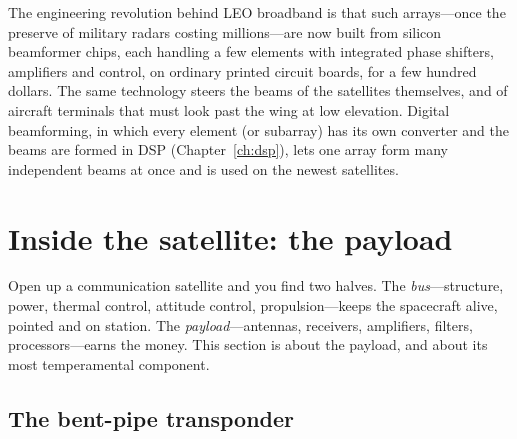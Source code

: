 
The engineering revolution behind LEO broadband is that such arrays---once the preserve of
military radars costing millions---are now built from silicon beamformer chips, each handling
a few elements with integrated phase shifters, amplifiers and control, on ordinary printed
circuit boards, for a few hundred dollars. The same technology steers the beams of the
satellites themselves, and of aircraft terminals that must look past the wing at low
elevation. Digital beamforming, in which every element (or subarray) has its own converter and
the beams are formed in DSP (Chapter~\ref{ch:dsp}), lets one array form many independent beams
at once and is used on the newest satellites.

\section{Inside the satellite: the payload}
\label{sec:ch23:payload}

Open up a communication satellite and you find two halves. The \emph{bus}---structure, power,
thermal control, attitude control, propulsion---keeps the spacecraft alive, pointed and on
station. The \emph{payload}---antennas, receivers, amplifiers, filters, processors---earns the
money. This section is about the payload, and about its most temperamental component.

\subsection{The bent-pipe transponder}

